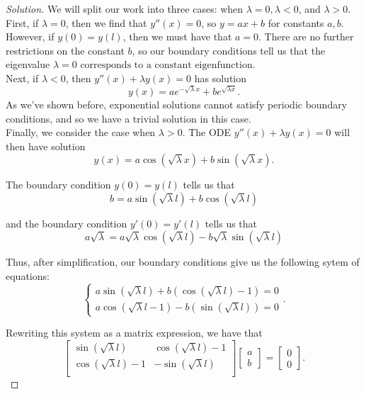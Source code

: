 \documentclass[11pt]{article}
\newenvironment{solution}
  {\renewcommand\qedsymbol{$\blacksquare$}\begin{proof}[Solution]}
  {\end{proof}}
\begin{document}
\begin{solution}
We will split our work into three cases: when $\lambda = 0, \lambda < 0$, and $\lambda > 0$. \\

First, if $\lambda = 0$, then we find that $y''(x) = 0$, so $y = ax + b$ for constants $a, b$. However, if $y(0) = y(l)$, then we must have that $a = 0$.
There are no further restrictions on the constant $b$, so our boundary conditions tell us that the eigenvalue $\boxed{\lambda = 0 \text{ corresponds to a constant eigenfunction}}.$ \\

Next, if $\lambda < 0$, then $y''(x) + \lambda y(x) = 0$ has solution \[ y(x) = ae^{-\sqrt{\lambda} x} + be^{\sqrt{\lambda x}}. \]
As we've shown before, exponential solutions cannot satisfy periodic boundary conditions, and so we have a trivial solution in this case. \\

Finally, we consider the case when $\lambda > 0$. The ODE $y''(x) + \lambda y(x) = 0$ will then have solution
\[ y(x) = a\cos(\sqrt{\lambda}x) + b\sin(\sqrt{\lambda}x).\]

The boundary condition $y(0) = y(l)$ tells us that \[ b = a\sin(\sqrt{\lambda} l) + b\cos(\sqrt{\lambda} l)\]

and the boundary condition $y'(0) = y'(l)$ tells us that \[ a\sqrt{\lambda} = a\sqrt{\lambda}\cos(\sqrt{\lambda} l) - b\sqrt{\lambda}\sin(\sqrt{\lambda} l)\]

Thus, after simplification, our boundary conditions give us the following sytem of equations:
\[ \begin{cases}
a\sin(\sqrt{\lambda} l) + b(\cos(\sqrt{\lambda} l) - 1) = 0 \\
a\cos(\sqrt{\lambda} l - 1) - b(\sin(\sqrt{\lambda} l)) = 0
\end{cases}.\]

Rewriting this system as a matrix expression, we have that
\[ 
\begin{bmatrix}
\sin(\sqrt{\lambda} l) & \cos(\sqrt{\lambda} l) - 1 \\
\cos(\sqrt{\lambda} l) - 1 & -\sin(\sqrt{\lambda} l) \\
\end{bmatrix}
\begin{bmatrix}
a \\ 
b
\end{bmatrix}
=
\begin{bmatrix}
0 \\ 0
\end{bmatrix}.\]


\end{solution}
\end{document}

